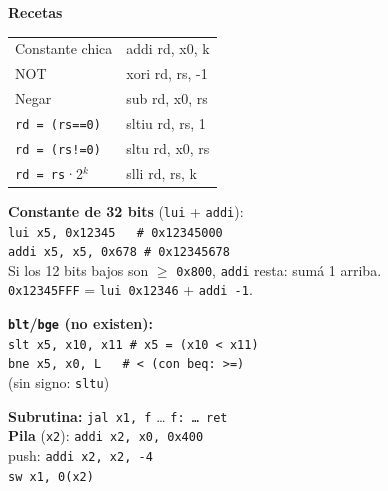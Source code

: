 \documentclass[9pt]{extarticle}
\newcommand{\mono}[1]{\texttt{#1}}
\newcommand{\seccion}[1]{{\color{acento}\bfseries\large #1}\par\vspace{1mm}}
\begin{document}
\begin{minipage}[t]{0.34\linewidth}
\seccion{Recetas}
{\footnotesize\renewcommand{\arraystretch}{1.05}
\begin{tabular}{@{}l>{\ttfamily}l@{}}
Constante chica   & addi rd, x0, k \\
NOT               & xori rd, rs, -1 \\
Negar             & sub rd, x0, rs \\
\mono{rd = (rs==0)} & sltiu rd, rs, 1 \\
\mono{rd = (rs!=0)} & sltu rd, x0, rs \\
\mono{rd = rs}·2$^k$ & slli rd, rs, k \\
\end{tabular}

\vspace{1.5mm}
\textbf{Constante de 32 bits} (\mono{lui} + \mono{addi}):\\[0.3mm]
\mono{lui x5, 0x12345 \ \ \# 0x12345000}\\
\mono{addi x5, x5, 0x678 \# 0x12345678}\\[0.5mm]
Si los 12 bits bajos son $\geq$ \mono{0x800}, \mono{addi} resta: sumá 1 arriba.\\
\mono{0x12345FFF} = \mono{lui 0x12346} + \mono{addi -1}.

\vspace{1.5mm}
\textbf{\mono{blt}/\mono{bge} (no existen):}\\[0.3mm]
\mono{slt x5, x10, x11 \# x5 = (x10 < x11)}\\
\mono{bne x5, x0, L \ \ \# < (con beq: >=)}\\
(sin signo: \mono{sltu})

\vspace{1.5mm}
\textbf{Subrutina:} \mono{jal x1, f} … \mono{f: … ret}\\
\textbf{Pila} (\mono{x2}): \mono{addi x2, x0, 0x400}\\
push: \mono{addi x2, x2, -4}\\
\phantom{push: }\mono{sw x1, 0(x2)}\par}
\end{minipage}
\end{document}
